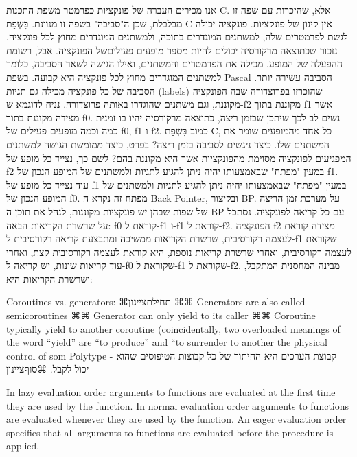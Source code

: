         אנו מכירים העברה של פונקציות כפרמטר משפת התכנות C. אלא, שהיכרות עם שפה זו
        מבלבלת, שכן ה"סביבה" בשפה זו מנוונת. בִּשְׂפַת C אין קינון של פונקציות. פונקציה
        יכולה לגשת לפרמטרים שלה, למשתנים המוגדרים בתוכה, ולמשתנים המוגדרים מחוץ לכל
        פונקציה. נזכור שכתוצאה מרקורסיה יכולים להיות מספר מופעים פעיליםשל הפונקציה.
        אבל, רשומת ההפעלה של המופע, מכילה את הפרמטרים והמשתנים, ואילו הגישה לשאר
        הסביבה, כלומר למשתנים המוגדרים מחוץ לכל פונקציה היא קבועה. בשפת Pascal הסביבה
        עשירה יותר. הסביבה של כל פונקציה מכילה גם תגיות (labels) שהוכרזו בפרוצדורה שבה
        הפונקציה מקוננת, וגם משתנים שהוגדרו באותה פרוצדורה. נניח לדוגמא ש-f2 מקוננת
        בתוך f1 אשר מצידה מקוננת בתוך f0. נשים לב לכך שיתכן שבזמן ריצה, כתוצאה מרקורסיה
        יהיו בו זמנית כמה וכמה מופעים פעילים של f0, f1 ו-f2. כמוב בִּשְׂפַת C, כל אחד
        מהמופעים שומר את המשתנים שלו.
        כיצד ניגשים לסביבה בזמן ריצה? בפרט, כיצד ממומשת הגישה למשתנים המפגיעים לפונקציה מסוימת מהפונקציות אשר היא מקוננת בהם? לשם כך, נצייד כל מופע של f2 במעין "מפתח" שבאמצעותו יהיה ניתן להגיע לתגיות ולמשתנים של המופע הנכון של f1. עוד נצייד כל מופע של f1 במעין "מפתח" שבאמצעותו יהיה ניתן להגיע לתגיות ולמשתנים של המופע הנכון של f0.
        מפתח זה נקרא ה Back Pointer, ובקיצור BP. על מערכת זמן הריצה של שפות שבהן יש פונקציות מקוננות, לנהל את תוכן ה-BP עם כל קריאה לפונקציה.
        נסתכל על שרשרת הקריאות הבאה: f0 קוראת ל-f1 ו-f1 קוראת ל-f2. הפונקציה f2 מצידה קוראת לעצמה רקורסיבית, שרשרת הקריאות ממשיכה ומתבצעת קריאה רקורסיבית ל-f1 שקוראת לעצמה רקורסיבית, ואחרי שרשרת קריאות נוספת, היא קוראת לעצמה רקורסיבית קצת, ואחרי עוד קריאות שונות, יש קריאה ל-f0 שקוראת ל-f1 שקוראת ל-f2.
        מבינה המחסנית המתקבל, ושרשרת הקריאות היא:

        Coroutines vs. generators:
        ⌘תחילת{ציינון}
        ⌘⌘ Generators are also called semicoroutines
        ⌘⌘ Generator can only yield to its caller
        ⌘⌘ Coroutine typically yield to another coroutine (coincidentally, two overloaded meanings of the word “yield” are “to produce” and “to surrender to another the physical control of som
        Polytype - קבוצת הערכים היא החיתוך של כל קבוצות הטיפוסים שהוא יכול לקבל.
    ⌘סוף{ציינון}

        In lazy evaluation order arguments to functions are
        evaluated at the first time they are used by the function.
        In normal evaluation order arguments to functions are
        evaluated whenever they are used by the function.
        An eager evaluation order specifies that all arguments
        to functions are evaluated before the procedure is applied.

